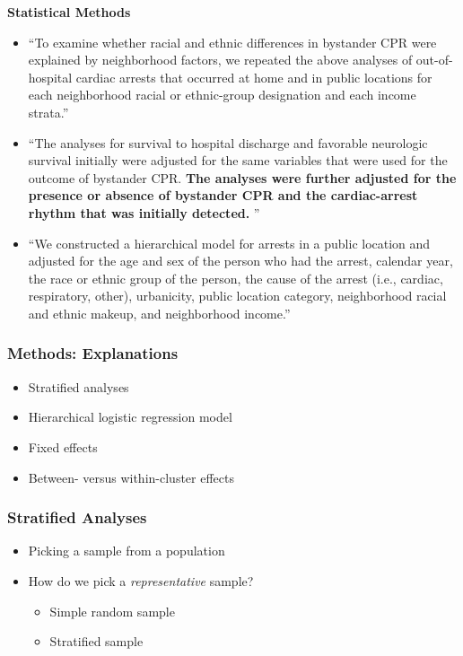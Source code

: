\documentclass{beamer}
\begin{document}
				\begin{frame}
					\textbf{Statistical Methods}
					\begin{itemize}
						\tiny
						\item``To examine whether racial and ethnic differences in bystander CPR were explained by neighborhood factors, we repeated the above analyses of out-of-hospital cardiac arrests that occurred at home and in public locations for each neighborhood racial or ethnic-group designation and each
						income strata.''
						\item ``The analyses for survival to hospital discharge and favorable neurologic survival initially were adjusted for the same variables that were used for the outcome of bystander CPR. \textbf{The analyses were further adjusted for the presence or absence of bystander CPR and the cardiac-arrest rhythm that was initially detected. }''
						\item ``We constructed a hierarchical model for arrests in a public location and adjusted for the age and sex of the person who had the arrest, calendar year, the race or ethnic group of the person, the cause of the arrest (i.e., cardiac, respiratory, other), urbanicity, public location category, neighborhood racial and ethnic makeup, and neighborhood income.''
					\end{itemize}
		\end{frame}
		\begin{frame}
				\frametitle{Methods: Explanations}
					\begin{itemize}
						\item Stratified analyses
						\item Hierarchical logistic regression model
						\item Fixed effects
						\item Between- versus within-cluster effects
					\end{itemize}
		\end{frame}
		\begin{frame}
			\frametitle{Stratified Analyses}
				\begin{itemize}
					\item Picking a sample from a population
					\item How do we pick a \textit{representative} sample?
						\begin{itemize}
							\item Simple random sample
							\item Stratified sample
						\end{itemize}
				\end{itemize}
		\end{frame}
\end{document}
